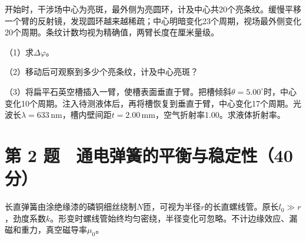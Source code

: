 \documentclass[12pt,a4paper,fontset=fandol]{ctexart}
\begin{document}
开始时，干涉场中心为亮斑，最外侧为亮圆环，计及中心共20个亮条纹。缓慢平移一个臂的反射镜，发现圆环越来越稀疏；中心明暗变化23个周期，视场最外侧变化20个周期。条纹计数均视为精确值，两臂长度在厘米量级。

（1）求\(\Delta\varphi\)。

（2）移动后可观察到多少个亮条纹，计及中心亮斑？

（3）将扁平石英空槽插入一臂，使槽表面垂直于臂。把槽倾斜\(\theta=5.00^\circ\)时，中心变化10个周期。注入待测液体后，再将槽恢复到垂直于臂，中心变化17个周期。光波长\(\lambda=633\,\mathrm{nm}\)，槽内壁间距\(t=2.00\,\mathrm{mm}\)，空气折射率1.00。求液体折射率。

\begin{center}
\begin{minipage}{\linewidth}
\centering\begingroup{}
\ifdim\wd\diagrambox>.88\linewidth
\sbox{\diagrambox}{\resizebox{.88\linewidth}{!}{\usebox{\diagrambox}}}\fi
\ifdim\ht\diagrambox>.20\textheight
\resizebox{!}{.20\textheight}{\usebox{\diagrambox}}
\else\usebox{\diagrambox}\fi
\par{}\endgroup\end{minipage}\end{center}

\clearpage

\section{第 2
题　通电弹簧的平衡与稳定性（40分）}\label{ux7b2c-2-ux9898-ux901aux7535ux5f39ux7c27ux7684ux5e73ux8861ux4e0eux7a33ux5b9aux602740ux5206}

长直弹簧由涂绝缘漆的磷铜细丝绕制\(N\)匝，可视为半径\(r\)的长直螺线管。原长\(l_0\gg r\)，劲度系数\(k\)。形变时螺线管始终均匀密绕，半径变化可忽略。不计边缘效应、漏磁和重力，真空磁导率\(\mu_0\)。
\end{document}
